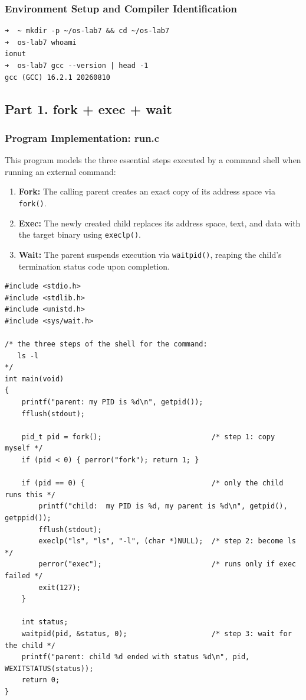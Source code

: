 \documentclass{labreport}
\begin{document}
\subsubsection*{Environment Setup and Compiler Identification}
\begin{lstlisting}[style=bash]
➜  ~ mkdir -p ~/os-lab7 && cd ~/os-lab7
➜  os-lab7 whoami
ionut
➜  os-lab7 gcc --version | head -1
gcc (GCC) 16.2.1 20260810
\end{lstlisting}

\subsection{Part 1. fork + exec + wait}

\subsubsection{Program Implementation: run.c}
This program models the three essential steps executed by a command shell when running an external command:
\begin{enumerate}[label=Step \arabic*:, noitemsep]
    \item \textbf{Fork:} The calling parent creates an exact copy of its address space via \texttt{fork()}.
    \item \textbf{Exec:} The newly created child replaces its address space, text, and data with the target binary using \texttt{execlp()}.
    \item \textbf{Wait:} The parent suspends execution via \texttt{waitpid()}, reaping the child's termination status code upon completion.
\end{enumerate}

\begin{lstlisting}[style=c]
#include <stdio.h>
#include <stdlib.h>
#include <unistd.h>
#include <sys/wait.h>

/* the three steps of the shell for the command:
   ls -l
*/
int main(void)
{
    printf("parent: my PID is %d\n", getpid());
    fflush(stdout);

    pid_t pid = fork();                          /* step 1: copy myself */
    if (pid < 0) { perror("fork"); return 1; }

    if (pid == 0) {                              /* only the child runs this */
        printf("child:  my PID is %d, my parent is %d\n", getpid(), getppid());
        fflush(stdout);
        execlp("ls", "ls", "-l", (char *)NULL);  /* step 2: become ls */
        perror("exec");                          /* runs only if exec failed */
        exit(127);
    }

    int status;
    waitpid(pid, &status, 0);                    /* step 3: wait for the child */
    printf("parent: child %d ended with status %d\n", pid, WEXITSTATUS(status));
    return 0;
}
\end{lstlisting}
\end{document}
